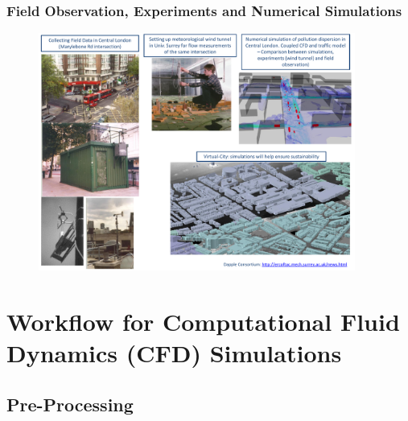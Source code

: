 \documentclass[10pt,compress]{beamer}
\begin{document}
\begin{frame}
 \frametitle{Field Observation, Experiments and Numerical Simulations} 

   \begin{figure}%
    \begin{center}
     \includegraphics[width=12.cm, height=7.8cm, clip]{./Figs/Dapple.pdf}
    \end{center}
   \end{figure}    
\end{frame}


\section{Workflow for Computational Fluid Dynamics (CFD) Simulations}

\subsection{Pre-Processing}
 
\end{document}
